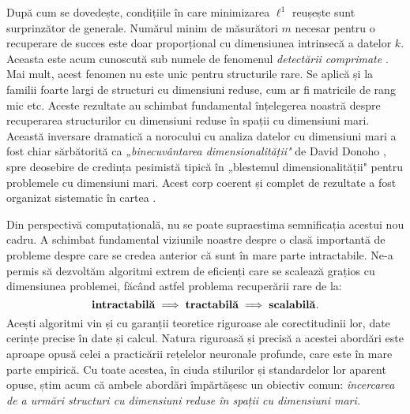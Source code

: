 \documentclass[../../book-main_ro.tex]{subfiles}
\begin{document}
După cum se dovedește, condițiile în care minimizarea $\ell^1$ reușește sunt surprinzător de generale. Numărul minim de măsurători $m$ necesar pentru o recuperare de succes este doar proporțional cu dimensiunea intrinsecă a datelor $k$. Aceasta este acum cunoscută sub numele de fenomenul {\em detectării comprimate} \cite{CandesE2006-ICM}. Mai mult, acest fenomen nu este unic pentru structurile rare. Se aplică și la familii foarte largi de structuri cu dimensiuni reduse, cum ar fi matricile de rang mic etc. Aceste rezultate au schimbat fundamental înțelegerea noastră despre recuperarea structurilor cu dimensiuni reduse în spații cu dimensiuni mari. Această inversare dramatică a norocului cu analiza datelor cu dimensiuni mari a fost chiar sărbătorită ca {\em „binecuvântarea dimensionalității"} de David Donoho \cite{DonohoD2000}, spre deosebire de credința pesimistă tipică în „blestemul dimensionalității" pentru problemele cu dimensiuni mari. Acest corp coerent și complet de rezultate a fost organizat sistematic în cartea \cite{Wright-Ma-2022}.

Din perspectivă computațională, nu se poate supraestima semnificația acestui nou cadru. A schimbat fundamental viziunile noastre despre o clasă importantă de probleme despre care se credea anterior că sunt în mare parte intractabile. Ne-a permis să dezvoltăm algoritmi extrem de eficienți care se scalează grațios cu dimensiunea problemei, făcând astfel problema recuperării rare de la:
\begin{equation}
    \mbox{\textbf{intractabilă}} \;
   \Longrightarrow \; \mbox{\textbf{tractabilă}} \; \Longrightarrow \;
   \mbox{\textbf{scalabilă}}.
\end{equation}
Acești algoritmi vin și cu garanții teoretice riguroase ale corectitudinii lor, date cerințe precise în date și calcul. Natura riguroasă și precisă a acestei abordări este aproape opusă celei a practicării rețelelor neuronale profunde, care este în mare parte empirică. Cu toate acestea, în ciuda stilurilor și standardelor lor aparent opuse, știm acum că ambele abordări împărtășesc un obiectiv comun: {\em încercarea de a urmări structuri cu dimensiuni reduse în spații cu dimensiuni mari.}
\end{document}
